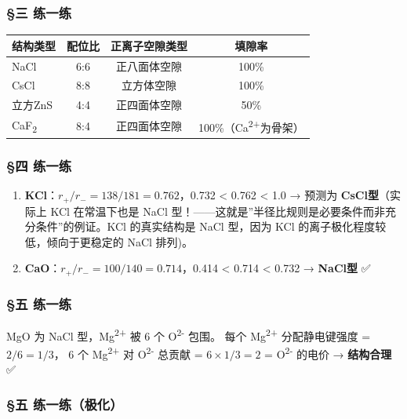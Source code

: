 \documentclass[a4paper,11pt]{ctexart}
\newcounter{none}
\begin{document}
\subsubsection{§三 练一练}\label{ux4e09-ux7ec3ux4e00ux7ec3}

{\def\LTcaptype{none} %
\begin{longtable}[]{@{}lccc@{}}
\toprule\noalign{}
结构类型 & 配位比 & 正离子空隙类型 & 填隙率 \\
\midrule\noalign{}
\endhead
\bottomrule\noalign{}
\endlastfoot
NaCl & 6:6 & 正八面体空隙 & 100\% \\
CsCl & 8:8 & 立方体空隙 & 100\% \\
立方ZnS & 4:4 & 正四面体空隙 & 50\% \\
CaF\textsubscript{2} & 8:4 & 正四面体空隙 & 100\%（Ca\textsuperscript{2+}为骨架） \\
\end{longtable}
}

\subsubsection{§四 练一练}\label{ux56db-ux7ec3ux4e00ux7ec3}

\begin{enumerate}
\def\labelenumi{(\arabic{enumi})}
\item
  \textbf{KCl}：\(r_+/r_- = 138/181 = 0.762\)，0.732 \textless{} 0.762 \textless{} 1.0 → 预测为 \textbf{CsCl型}（实际上 KCl 在常温下也是 NaCl 型！------这就是''半径比规则是必要条件而非充分条件''的例证。KCl 的真实结构是 NaCl 型，因为 KCl 的离子极化程度较低，倾向于更稳定的 NaCl 排列)。
\item
  \textbf{CaO}：\(r_+/r_- = 100/140 = 0.714\)，0.414 \textless{} 0.714 \textless{} 0.732 → \textbf{NaCl型} ✅
\end{enumerate}

\subsubsection{§五 练一练}\label{ux4e94-ux7ec3ux4e00ux7ec3}

MgO 为 NaCl 型，Mg\textsuperscript{2+} 被 6 个 O\textsuperscript{2-} 包围。
每个 Mg\textsuperscript{2+} 分配静电键强度 = \(2/6 = 1/3\)，
6 个 Mg\textsuperscript{2+} 对 O\textsuperscript{2-} 总贡献 = \(6 \times 1/3 = 2\) = O\textsuperscript{2-} 的电价 → \textbf{结构合理} ✅

\subsubsection{§五 练一练（极化）}\label{ux4e94-ux7ec3ux4e00ux7ec3ux6781ux5316}
\end{document}

